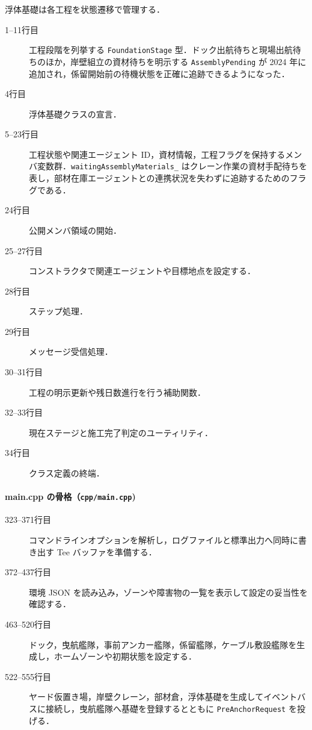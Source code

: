\documentclass[10pt,letterpaper]{jsarticle}
\begin{document}
浮体基礎は各工程を状態遷移で管理する．
\begin{description}
  \item[1--11行目] 工程段階を列挙する \texttt{FoundationStage} 型．ドック出航待ちと現場出航待ちのほか，岸壁組立の資材待ちを明示する \texttt{AssemblyPending} が 2024 年に追加され，係留開始前の待機状態を正確に追跡できるようになった．
  \item[4行目] 浮体基礎クラスの宣言．
  \item[5--23行目] 工程状態や関連エージェント ID，資材情報，工程フラグを保持するメンバ変数群．\texttt{waitingAssemblyMaterials\_} はクレーン作業の資材手配待ちを表し，部材在庫エージェントとの連携状況を失わずに追跡するためのフラグである．
  \item[24行目] 公開メンバ領域の開始．
  \item[25--27行目] コンストラクタで関連エージェントや目標地点を設定する．
  \item[28行目] ステップ処理．
  \item[29行目] メッセージ受信処理．
  \item[30--31行目] 工程の明示更新や残日数進行を行う補助関数．
  \item[32--33行目] 現在ステージと施工完了判定のユーティリティ．
  \item[34行目] クラス定義の終端．
\end{description}

\paragraph{main.cpp の骨格（\texttt{cpp/main.cpp})}

\begin{description}
  \item[323--371行目] コマンドラインオプションを解析し，ログファイルと標準出力へ同時に書き出す Tee バッファを準備する．
  \item[372--437行目] 環境 JSON を読み込み，ゾーンや障害物の一覧を表示して設定の妥当性を確認する．
  \item[463--520行目] ドック，曳航艦隊，事前アンカー艦隊，係留艦隊，ケーブル敷設艦隊を生成し，ホームゾーンや初期状態を設定する．
  \item[522--555行目] ヤード仮置き場，岸壁クレーン，部材倉，浮体基礎を生成してイベントバスに接続し，曳航艦隊へ基礎を登録するとともに \texttt{PreAnchorRequest} を投げる．
\end{description}
\end{document}
